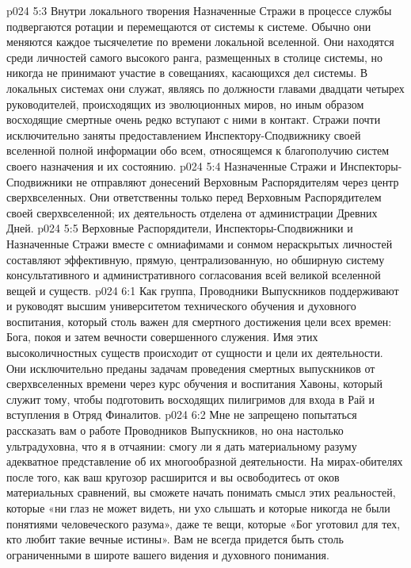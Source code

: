 \vs p024 5:3 Внутри локального творения Назначенные Стражи в процессе службы подвергаются ротации и перемещаются от системы к системе. Обычно они меняются каждое тысячелетие по времени локальной вселенной. Они находятся среди личностей самого высокого ранга, размещенных в столице системы, но никогда не принимают участие в совещаниях, касающихся дел системы. В локальных системах они служат, являясь по должности главами двадцати четырех руководителей, происходящих из эволюционных миров, но иным образом восходящие смертные очень редко вступают с ними в контакт. Стражи почти исключительно заняты предоставлением Инспектору\hyp{}Сподвижнику своей вселенной полной информации обо всем, относящемся к благополучию систем своего назначения и их состоянию.
\vs p024 5:4 Назначенные Стражи и Инспекторы\hyp{}Сподвижники не отправляют донесений Верховным Распорядителям через центр сверхвселенных. Они ответственны только перед Верховным Распорядителем своей сверхвселенной; их деятельность отделена от администрации Древних Дней.
\vs p024 5:5 \pc Верховные Распорядители, Инспекторы\hyp{}Сподвижники и Назначенные Стражи вместе с омниафимами и сонмом нераскрытых личностей составляют эффективную, прямую, централизованную, но обширную систему консультативного и административного согласования всей великой вселенной вещей и существ.
\vs p024 6:1 Как группа, Проводники Выпускников поддерживают и руководят высшим университетом технического обучения и духовного воспитания, который столь важен для смертного достижения цели всех времен: Бога, покоя и затем вечности совершенного служения. Имя этих высоколичностных существ происходит от сущности и цели их деятельности. Они исключительно преданы задачам проведения смертных выпускников от сверхвселенных времени через курс обучения и воспитания Хавоны, который служит тому, чтобы подготовить восходящих пилигримов для входа в Рай и вступления в Отряд Финалитов.
\vs p024 6:2 Мне не запрещено попытаться рассказать вам о работе Проводников Выпускников, но она настолько ультрадуховна, что я в отчаянии: смогу ли я дать материальному разуму адекватное представление об их многообразной деятельности. На мирах\hyp{}обителях после того, как ваш кругозор расширится и вы освободитесь от оков материальных сравнений, вы сможете начать понимать смысл этих реальностей, которые «ни глаз не может видеть, ни ухо слышать и которые никогда не были понятиями человеческого разума», даже те вещи, которые «Бог уготовил для тех, кто любит такие вечные истины». Вам не всегда придется быть столь ограниченными в широте вашего видения и духовного понимания.
